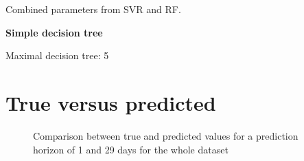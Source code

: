 \noindent
Combined parameters from SVR and RF.

\noindent
\textbf{Simple decision tree}

\noindent
Maximal decision tree: 5

\section{True versus predicted}
\label{sec:TrueVersusPredicted}

\begin{figure}[htbp]
  \centering
  
  \caption{Comparison between true and predicted values for a prediction horizon of 1 and 29 days for the whole dataset}
  \label{fig:StackedComparissonFullData}
\end{figure}






